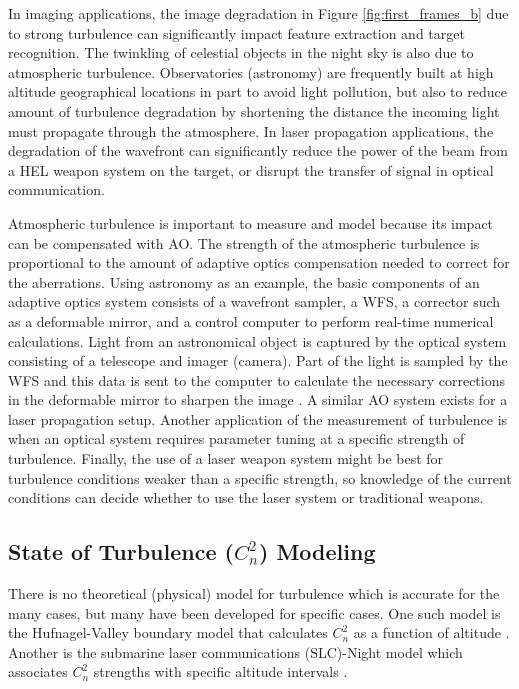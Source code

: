 In imaging applications, the image degradation in Figure \ref{fig:first_frames_b} due to strong turbulence can significantly impact feature extraction and target recognition. The twinkling of celestial objects in the night sky is also due to atmospheric turbulence. Observatories (astronomy) are frequently built at high altitude geographical locations in part to avoid light pollution, but also to reduce amount of turbulence degradation by shortening the distance the incoming light must propagate through the atmosphere. In laser propagation applications, the degradation of the wavefront can significantly reduce the power of the beam from a \ac{HEL} weapon system on the target, or disrupt the transfer of signal in optical communication.

Atmospheric turbulence is important to measure and model because its impact can be compensated with \ac{AO}. The strength of the atmospheric turbulence is proportional to the amount of adaptive optics compensation needed to correct for the aberrations. Using astronomy as an example, the basic components of an adaptive optics system consists of a wavefront sampler, a \ac{WFS}, a corrector such as a deformable mirror, and a control computer to perform real-time numerical calculations. Light from an astronomical object is captured by the optical system consisting of a telescope and imager (camera). Part of the light is sampled by the \ac{WFS} and this data is sent to the computer to calculate the necessary corrections in the deformable mirror to sharpen the image \cite{tyson2011principles}. A similar \ac{AO} system exists for a laser propagation setup. Another application of the measurement of turbulence is when an optical system requires parameter tuning at a specific strength of turbulence. Finally, the use of a laser weapon system might be best for turbulence conditions weaker than a specific strength, so knowledge of the current conditions can decide whether to use the laser system or traditional weapons.

\subsection{State of Turbulence ($C_{n}^{2}$) Modeling}
There is no theoretical (physical) model for turbulence which is accurate for the many cases, but many have been developed for specific cases. One such model is the Hufnagel-Valley boundary model that calculates $C_{n}^{2}$ as a function of altitude \cite{Valley:80}. Another is the submarine laser communications (SLC)-Night model which associates $C_{n}^{2}$ strengths with specific altitude intervals \cite{tyson2011principles}.

